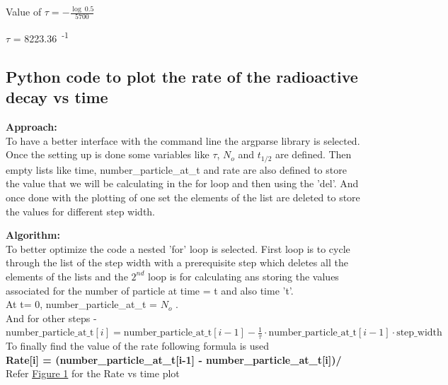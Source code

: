 \documentclass[11pt]{article}
\begin{document}
\begin{justify}
Value of $\tau = -\frac{\log\ 0.5}{5700}$

$\tau$ = 8223.36\, \textsuperscript{-1}

\begin{figure}[h]

\end{figure}

\subsection{Python code to plot the rate of the radioactive decay vs time}
\begin{raggedright}
\begin{justify}
\textbf{Approach:}\\
To have a better interface with the command line the argparse library is selected. Once the setting up is done some variables like $\tau$, $N_{o}$ and $t_{1/2}$ are defined. Then empty lists like time, number\_particle\_at\_t and rate are also defined to store the value that we will be calculating in the for loop and then using the 'del'. And once done with the plotting of one set the elements of the list are deleted to store the values for different step width.
\end{justify}
\end{raggedright}

\begin{raggedright}
\begin{justify}
\textbf{Algorithm:}\\
To better optimize the code a nested 'for' loop is selected. First loop is to cycle through the list of the step width with a prerequisite step which deletes all the elements of the lists and the $2^{nd}$ loop is for calculating ans storing the values associated for the number of particle at time = t and also time 't'.\\
At t= 0, number\_particle\_at\_t = $N_{o}$ .\\
And for other steps - \\
\textbf{\( \text{number\_particle\_at\_t}[i]=\text{number\_particle\_at\_t}[i-1] - \frac{1}{\tau} \cdot \text{number\_particle\_at\_t}[i-1] \cdot \text{step\_width}\)} \\
To finally find the value of the rate following formula is used\\
\textbf{Rate[i] = (number\_particle\_at\_t[i-1] - number\_particle\_at\_t[i])/}\\
Refer \hyperref[fig:Rate of radioactive decay for step width = 10, 100]{Figure 1} for the Rate vs time plot
\end{justify}
\end{raggedright}


\end{justify}
\end{document}
